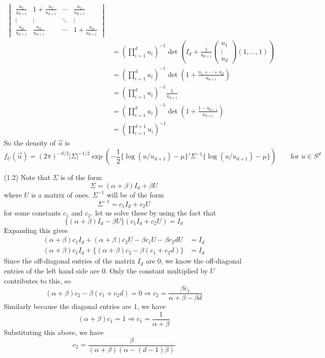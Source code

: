 \documentclass[letterpaper,10pt]{amsart}
\begin{document}
\begin{enumerate}[(1)]
\begin{align*}
\begin{vmatrix}
\frac{u_2}{u_{d+1}} & 1+\frac{u_2}{u_{d+1}} & \cdots & \frac{u_2}{u_{d+1}}\\
\vdots & \vdots & \ddots & \vdots\\
\frac{u_d}{u_{d+1}} & \frac{u_d}{u_{d+1}} & \cdots & 1 + \frac{u_d}{u_{d+1}}
\end{vmatrix}\\
&= \left(\prod_{i=1}^d u_i\right)^{-1} \det\left(I_d + \frac{1}{u_{d+1}} \begin{pmatrix}
u_1\\ \vdots \\ u_d
\end{pmatrix}(1,\ldots,1) \right)\\
&= \left(\prod_{i=1}^d u_i\right)^{-1} \det\left( 1 + \frac{u_1 + \cdots + u_d}{u_{d+1}}\right)\\
&=  \left(\prod_{i=1}^d u_i\right)^{-1} \frac{1}{u_{d+1}}\\
&=  \left(\prod_{i=1}^d u_i\right)^{-1} \det\left(1 + \frac{1-u_{d+1}}{u_{d+1}}\right)\\
&=  \left(\prod_{i=1}^{d+1} u_i\right)^{-1}
\end{align*}
So the density of $\vec{u}$ is
\[f_U(\vec{u}) = (2\pi)^{-d/2} |\Sigma|^{-1/2} \exp\left(-\frac{1}{2}\{\log(u/u_{d+1}) - \mu\}' \Sigma^{-1} \{\log(u/u_{d+1}) - \mu\}\right) \qquad \text{for } u \in S^d\]

\item[(1.2)]
Note that $\Sigma$ is of the form
\[\Sigma = (\alpha + \beta) I_d + \beta U\]
where $U$ is a matrix of ones. $\Sigma^{-1}$ will be of the form
\[\Sigma^{-1} = c_1 I_d + c_2 U\]
for some constants $c_1$ and $c_2$. let us solve these by using the fact that
\[\{(\alpha + \beta) I_d - \beta U\} (c_1 I_d + c_2 U) = I_d\]
Expanding this gives 
\begin{align*}
(\alpha + \beta) c_1 I_d + (\alpha + \beta) c_2 U - \beta c_1 U - \beta c_2 d U &= I_d\\
(\alpha + \beta) c_1 I_d + \{(\alpha + \beta) c_2 - \beta(c_1 + c_2 d)\} &= I_d
\end{align*}
Since the off-diagonal entries of the matrix $I_d$ are 0, we know the off-diagonal entries of the left hand side are 0. Only the constant multiplied by $U$ contributes to this, so 
\[(\alpha + \beta) c_2 - \beta(c_1 + c_2 d) =0 \Rightarrow c_2 = \frac{\beta c_1}{\alpha + \beta - \beta d} \]
Similarly because the diagonal entries are 1, we have
\[(\alpha + \beta) c_1 = 1 \Rightarrow c_1 = \frac{1}{\alpha + \beta}\]
Substituting this above, we have
\[c_2 = \frac{\beta}{(\alpha + \beta)(\alpha - (d-1) \beta)}\]


\end{enumerate}
\end{document}
